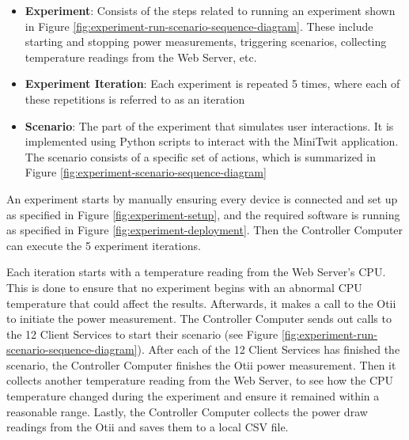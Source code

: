 \documentclass[main.tex]{subfiles}
\begin{document}
\begin{itemize}
    \item \textbf{Experiment}: Consists of the steps related to running an experiment shown in Figure \ref{fig:experiment-run-scenario-sequence-diagram}. These include starting and stopping power measurements, triggering scenarios, collecting temperature readings from the Web Server, etc.
    \item \textbf{Experiment Iteration}: Each experiment is repeated 5 times, where each of these repetitions is referred to as an iteration
    \item \textbf{Scenario}: The part of the experiment that simulates user interactions. It is implemented using Python scripts to interact with the MiniTwit application. The scenario consists of a specific set of actions, which is summarized in Figure \ref{fig:experiment-scenario-sequence-diagram}
\end{itemize}

An experiment starts by manually ensuring every device is connected and set up as specified in Figure \ref{fig:experiment-setup}, and the required software is running as specified in Figure \ref{fig:experiment-deployment}. Then the Controller Computer can execute the 5 experiment iterations.

Each iteration starts with a temperature reading from the Web Server's CPU. This is done to ensure that no experiment begins with an abnormal CPU temperature that could affect the results. Afterwards, it makes a call to the Otii to initiate the power measurement. The Controller Computer sends out calls to the 12 Client Services to start their scenario (see Figure \ref{fig:experiment-run-scenario-sequence-diagram}). After each of the 12 Client Services has finished the scenario, the Controller Computer finishes the Otii power measurement. Then it collects another temperature reading from the Web Server, to see how the CPU temperature changed during the experiment and ensure it remained within a reasonable range. Lastly, the Controller Computer collects the power draw readings from the Otii and saves them to a local CSV file.
\end{document}

